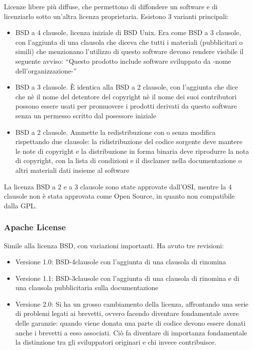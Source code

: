 Licenze libere pi\`u diffuse, che permettono di diffondere un software e di licenziarlo sotto un'altra licenza proprietaria. Esistono 3 varianti principali:
\begin{itemize}
\item BSD a 4 clausole, licenza iniziale di BSD Unix. Era come BSD a 3 clausole, con l'aggiunta di una clausola che diceva che tutti i materiali (pubblicitari o simili) che menzionano l'utilizzo di questo software devono rendere visibile il seguente avviso: ``Questo prodotto include software sviluppato da -nome dell'organizzazione-''
\item BSD a 3 clausole. \`E identica alla BSD a 2 clausole, con l'aggiunta che dice che n\`e il nome del detentore del copyright n\`e il nome dei suoi contributori possono essere usati per promuovere i prodotti derivati da questo software senza un permesso scritto dal posessore iniziale
\item BSD a 2 clausole. Ammette la redistribuzione con o senza modifica rispettando due clausole: la ridistribuzione del codice sorgente deve mantere le note di copyright e la distribuzione in forma binaria deve riprodurre la nota di copyright, con la lista di condizioni e il disclamer nella documentazione o altri materiali dati insieme al software
\end{itemize}

La licenza BSD a 2 e a 3 clausole sono state approvate dall'OSI, mentre la 4 clausole non \`e stata approvata come Open Source, in quanto non compatibile dalla GPL.

\newpage

\subsubsection{Apache License}

Simile alla licenza BSD, con variazioni importanti. Ha avuto tre revisioni:
\begin{itemize}

\item Versione 1.0: BSD-4clausole con l'aggiunta di una clausola di rinomina
\item Versione 1.1: BSD-3clausole con l'aggiunta di una clausola di rinomina e di una clausola pubblicitaria sulla documentazione
\item Versione 2.0: Si ha un grosso cambiamento della licenza, affrontando una serie di problemi legati ai brevetti, ovvero facendo diventare fondamentale avere delle garanzie: quando viene donata una parte di codice devono essere donati anche i brevetti a esso associati. Ci\`o fa diventare di importanza fondamentale la distinzione tra gli sviluppatori originari e chi invece contribuisce.
\end{itemize}

